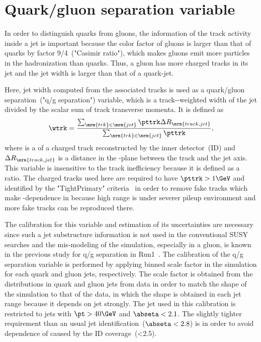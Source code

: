 

\section{Quark/gluon separation variable}
\label{sec:QG-var}

In order to distinguish quarks from gluons, %
the information of the track activity inside a jet is important %
because the color factor of gluons is larger than that of quarks by factor 9/4~("Casimir ratio"), %
which makes gluons emit more particles in the hadronization than quarks. %
Thus, a gluon has more charged tracks in its jet and the jet width is larger than that of a quark-jet.

Here, jet width computed from the associated tracks \wtrk is used as a quark/gluon separation~("q/g separation") variable, %
which is a track-\pt-weighted width of the jet divided by the scalar sum of track transverse momenta. %
It is defined as %
\begin{equation}
  \wtrk = \frac{ \sum_{\mrm{trk}\in\mrm{jet}}\pttrk\Delta R_{\mrm{track,jet}} }{ \sum_{\mrm{trk}\in\mrm{jet}}\pttrk },
\end{equation}
where \pttrk is a \pt of a charged track reconstructed by the inner detector~(ID) and %
$\Delta R_{\mrm{track,jet}}$ is a distance in the \eta-\phi plane between the track and the jet axis. %
This variable is insensitive to the track inefficiency because it is defined as a ratio. %
The charged tracks used here are required to have $\pttrk>1\GeV$ and identified by the "TightPrimary" criteria~\cite{TrackPerformance} %
in order to remove fake tracks which make \etaX-dependence in \wtrk because high \eta range is under severer pileup environment %
and more fake tracks can be reproduced there. %

The calibration for this variable and estimation of its uncertainties are necessary %
since such a jet substructure information is not used in the conventional SUSY searches and %
the mis-modeling of the simulation, especially in a gluon, is known in the previous study for q/g separation in Run1~\cite{QGRun1}. %
The calibration of the q/g separation variable is performed by applying binned scale factor in the simulation for each quark and gluon jets, respectively.
The scale factor is obtained from the \wtrk distributions in quark and gluon jets from data in order to match the shape of the simulation to that of the data, %
in which the shape is obtained in each jet \pt range because it depends on jet \pt strongly. %
The jet used in this calibration is restricted to jets with $\pt>40\GeV$ and $\abseta<2.1$. %
The slightly tighter \abseta requirement than an usual jet identification~($\abseta<2.8$) is %
in order to avoid \abseta dependence of \wtrk caused by the ID coverage~(\abseta<2.5). %

